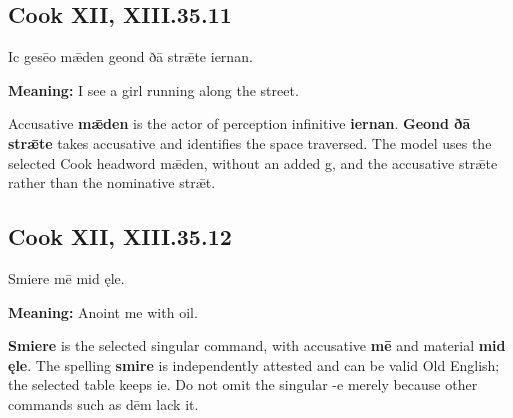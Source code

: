 \par\begin{minipage}{\linewidth}\raggedright
\subsection*{Cook XII, XIII.35.11}

Ic gesēo mǣden geond ðā strǣte iernan.

\textbf{Meaning:} I see a girl running along the street.

Accusative \textbf{mǣden} is the actor of perception infinitive \textbf{iernan}. \textbf{Geond ðā strǣte} takes accusative and identifies the space traversed. The model uses the selected Cook headword mǣden, without an added g, and the accusative strǣte rather than the nominative strǣt.

\end{minipage}\par\addvspace{4pt}

\par\begin{minipage}{\linewidth}\raggedright
\subsection*{Cook XII, XIII.35.12}

Smiere mē mid ęle.

\textbf{Meaning:} Anoint me with oil.

\textbf{Smiere} is the selected singular command, with accusative \textbf{mē} and material \textbf{mid ęle}. The spelling \textbf{smire} is independently attested and can be valid Old English; the selected table keeps ie. Do not omit the singular -e merely because other commands such as dēm lack it.

\end{minipage}\par\addvspace{4pt}

